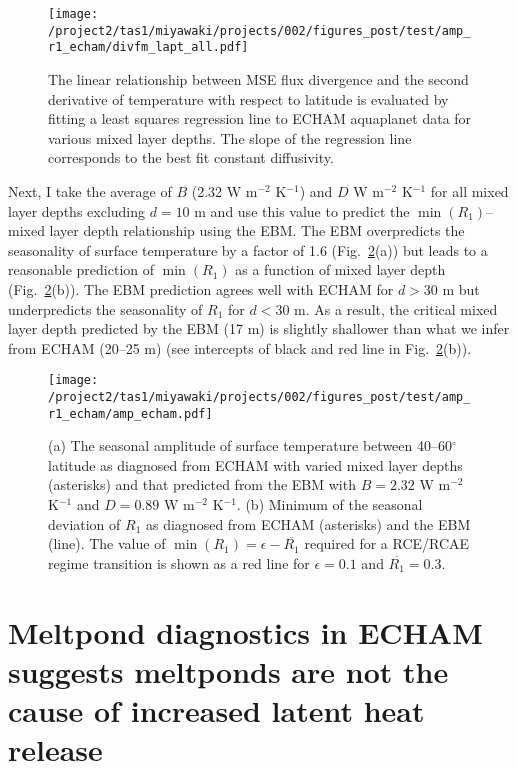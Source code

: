 \documentclass{article}
\begin{document}
\begin{figure}
    \texttt{[image: /project2/tas1/miyawaki/projects/002/figures\_post/test/amp\_r1\_echam/divfm\_lapt\_all.pdf]}
    \caption{The linear relationship between MSE flux divergence and the second derivative of temperature with respect to latitude is evaluated by fitting a least squares regression line to ECHAM aquaplanet data for various mixed layer depths. The slope of the regression line corresponds to the best fit constant diffusivity.}
    \label{fig:divfm-lapt}
\end{figure}

Next, I take the average of $B$ (2.32 W m$^{-2}$ K$^{-1}$) and $D$ W m$^{-2}$ K$^{-1}$ for all mixed layer depths excluding $d=10$ m and use this value to predict the $\min(R_1)$--mixed layer depth relationship using the EBM. The EBM overpredicts the seasonality of surface temperature by a factor of 1.6 (Fig.~\ref{fig:amp-echam}(a)) but leads to a reasonable prediction of $\min(R_1)$ as a function of mixed layer depth (Fig.~\ref{fig:amp-echam}(b)). The EBM prediction agrees well with ECHAM for $d>30$ m but underpredicts the seasonality of $R_1$ for $d<30$ m. As a result, the critical mixed layer depth predicted by the EBM (17 m) is slightly shallower than what we infer from ECHAM (20--25 m) (see intercepts of black and red line in Fig.~\ref{fig:amp-echam}(b)). 

\begin{figure}
    \texttt{[image: /project2/tas1/miyawaki/projects/002/figures\_post/test/amp\_r1\_echam/amp\_echam.pdf]}
    \caption{(a) The seasonal amplitude of surface temperature between 40--60$^{\circ}$ latitude as diagnosed from ECHAM with varied mixed layer depths (asterisks) and that predicted from the \cite{rose2017} EBM with $B=2.32$ W m$^{-2}$ K$^{-1}$ and $D=0.89$ W m$^{-2}$ K$^{-1}$. (b) Minimum of the seasonal deviation of $R_{1}$ as diagnosed from ECHAM (asterisks) and the EBM (line). The value of $\min(R_1)=\epsilon-\overline{R_1}$ required for a RCE/RCAE regime transition is shown as a red line for $\epsilon=0.1$ and $\overline{R_1}=0.3$.}
    \label{fig:amp-echam}
\end{figure}

\section{Meltpond diagnostics in ECHAM suggests meltponds are not the cause of increased latent heat release}
\end{document}
